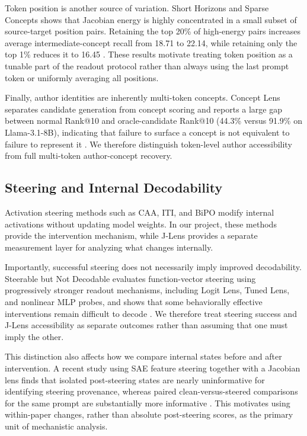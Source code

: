 \documentclass[sigconf,nonacm]{acmart}
\begin{document}
Token position is another source of variation. Short Horizons and Sparse
Concepts shows that Jacobian energy is highly concentrated in a small
subset of source-target position pairs. Retaining the top 20\% of
high-energy pairs increases average intermediate-concept recall from
18.71 to 22.14, while retaining only the top 1\% reduces it to 16.45
\cite{shorthorizons2026}. These results motivate treating token position
as a tunable part of the readout protocol rather than always using the
last prompt token or uniformly averaging all positions.
 
Finally, author identities are inherently multi-token concepts. Concept
Lens separates candidate generation from concept scoring and reports a
large gap between normal Rank@10 and oracle-candidate Rank@10
(44.3\% versus 91.9\% on Llama-3.1-8B), indicating that failure to
surface a concept is not equivalent to failure to represent it
\cite{conceptlens2026}. We therefore distinguish token-level author
accessibility from full multi-token author-concept recovery.
 
\subsection{Steering and Internal Decodability}
 
Activation steering methods such as CAA, ITI, and BiPO modify internal
activations without updating model weights. In our project, these methods
provide the intervention mechanism, while J-Lens provides a separate
measurement layer for analyzing what changes internally.
 
Importantly, successful steering does not necessarily imply improved
decodability. Steerable but Not Decodable evaluates function-vector
steering using progressively stronger readout mechanisms, including
Logit Lens, Tuned Lens, and nonlinear MLP probes, and shows that some
behaviorally effective interventions remain difficult to decode
\cite{nadaf2026steerable}. We therefore treat steering success and
J-Lens accessibility as separate outcomes rather than assuming that one
must imply the other.
 
This distinction also affects how we compare internal states before and
after intervention. A recent study using SAE feature steering together
with a Jacobian lens finds that isolated post-steering states are nearly
uninformative for identifying steering provenance, whereas paired
clean-versus-steered comparisons for the same prompt are substantially
more informative \cite{jones2026saesteering}. This motivates using
within-paper changes, rather than absolute post-steering scores, as the
primary unit of mechanistic analysis.
 
\end{document}
